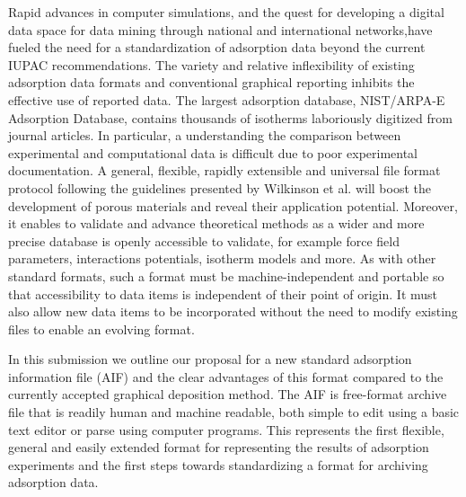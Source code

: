 \documentclass[journal=langd5,manuscript=article]{achemso}
\begin{document}
Rapid advances in computer simulations, and the quest for developing a digital data space for data mining through national and international networks,have fueled the need for a standardization of adsorption data beyond the current IUPAC recommendations.
The variety and relative inflexibility of existing adsorption data formats and conventional graphical reporting inhibits the effective use of reported data.
The largest adsorption database, NIST/ARPA-E Adsorption Database, contains thousands of isotherms laboriously digitized from journal articles.\cite{NIST}
In particular, a understanding the comparison between experimental and computational data is difficult due to poor experimental documentation.\cite{10.1021/acs.chemmater.7b04287}
A general, flexible, rapidly extensible and universal file format protocol following the guidelines presented by Wilkinson et al. will boost the development of porous materials and reveal their application potential.
Moreover, it enables to validate and advance theoretical methods as a wider and more precise database is openly accessible to validate, for example force field parameters, interactions potentials, isotherm models and more. 
As with other standard formats, such a format must be machine-independent and portable so that accessibility to data items is independent of their point of origin.
It must also allow new data items to be incorporated without the need to modify existing files to enable an evolving format.

In this submission we outline our proposal for a new standard adsorption information file (AIF) and the clear advantages of this format compared to the currently accepted graphical deposition method.
The AIF is free-format archive file that is readily human and machine readable, both simple to edit using a basic text editor or parse using computer programs.
This represents the first flexible, general and easily extended format for representing the results of adsorption experiments and the first steps towards standardizing a format for archiving adsorption data. 
\end{document}
